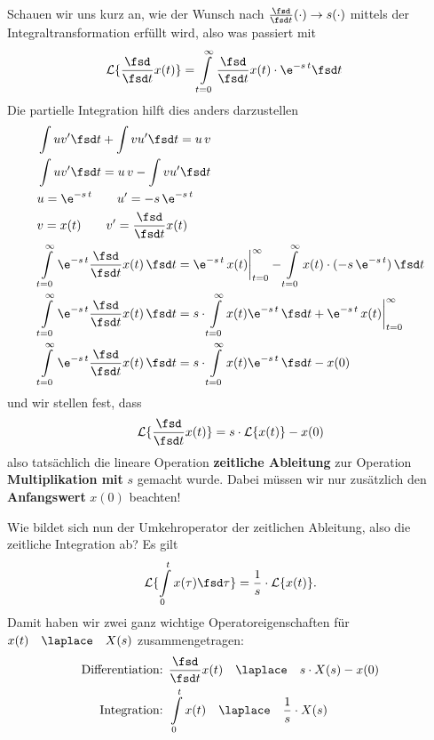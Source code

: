 Schauen wir uns kurz an, wie der Wunsch nach
$\frac{\fsd }{\fsd t} (\cdot) \rightarrow s(\cdot )$
mittels der Integraltransformation erfüllt wird, also was passiert mit
\begin{align}
\mathcal{L}\{\frac{\fsd }{\fsd t}  x(t)\} &= \int\limits_{t=0}^{\infty} \frac{\fsd }{\fsd t}  x(t) \cdot \e^{-s\,t} \fsd t
\end{align}
Die partielle Integration hilft dies anders darzustellen
\begin{align}
&\int u v' \fsd t + \int v u' \fsd t = u\,v\\
&\int u v' \fsd t = u\,v - \int v u' \fsd t\\
&u = \e^{-s\,t}\qquad u' = -s\,\e^{-s\,t}\\
&v = x(t)\qquad v' = \frac{\fsd }{\fsd t}  x(t)\\
&\int\limits_{t=0}^{\infty} \e^{-s\,t} \frac{\fsd }{\fsd t}  x(t) \, \fsd t
= \e^{-s\,t}\,x(t)\bigg|_{t=0}^{\infty} - \int\limits_{t=0}^{\infty} x(t) \cdot (-s\,\e^{-s\,t}) \, \fsd t\\
&\int\limits_{t=0}^{\infty} \e^{-s\,t} \frac{\fsd }{\fsd t}  x(t) \, \fsd t
= s \cdot \int\limits_{t=0}^{\infty} x(t) \e^{-s\,t} \, \fsd t
+\e^{-s\,t}\,x(t)\bigg|_{t=0}^{\infty}\\
&\int\limits_{t=0}^{\infty} \e^{-s\,t} \frac{\fsd }{\fsd t}  x(t) \, \fsd t
= s \cdot \int\limits_{t=0}^{\infty} x(t) \e^{-s\,t} \, \fsd t - x(0)
\end{align}
und wir stellen fest, dass
\begin{align}
\mathcal{L}\{\frac{\fsd }{\fsd t}  x(t)\}  = s \cdot \mathcal{L}\{x(t)\} - x(0)
\end{align}
also tatsächlich die lineare Operation \textbf{zeitliche Ableitung} zur Operation
\textbf{Multiplikation mit} $s$ gemacht wurde. Dabei müssen wir nur zusätzlich den
\textbf{Anfangswert} $x(0)$ beachten!

Wie bildet sich nun der Umkehroperator der zeitlichen Ableitung, also die zeitliche
Integration ab? Es gilt
\begin{align}
\mathcal{L}\{\int\limits_{0}^{t} x(\tau)\fsd \tau\}  = \frac{1}{s} \cdot \mathcal{L}\{x(t)\}.
\end{align}
Damit haben wir zwei ganz wichtige Operatoreigenschaften für
$x(t)\quad\laplace\quad X(s)$ zusammengetragen:
\begin{align}
\text{Differentiation:   } &\frac{\fsd }{\fsd t}  x(t) \quad\laplace\quad s\cdot X(s) - x(0)\\
\text{Integration:   } &\int\limits_{0}^{t} x(t) \quad\laplace\quad \frac{1}{s} \cdot X(s)
\end{align}

